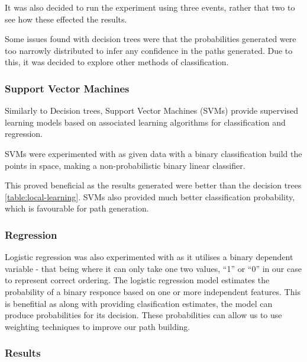 \documentclass[bsc,frontabs,twoside,singlespacing,parskip,deptreport]{infthesis}     %
\begin{document}
It was also decided to run the experiment using three events, rather that two to see how these
effected the results. 

Some issues found with decision trees were that the probabilities generated were too narrowly distributed
to infer any confidence in the paths generated. Due to this, it was decided to explore other methods of
classification.

\subsubsection{Support Vector Machines}
Similarly to Decision trees, Support Vector Machines (SVMs) provide supervised learning models based on
associated learning algorithms for classification and regression.

SVMs were experimented with as given data with a binary classification build the points in space,
making a non-probabilistic binary linear classifier.

This proved beneficial as the results generated were better than the decision trees \ref{table:local-learning}.
SVMs also provided much better classification probability, which is favourable for path generation.
\vspace{4em}
\subsubsection{Regression}
Logistic regression was also experimented with as it utilises a binary dependent variable - that being where it
can only take one two values, ``1'' or ``0'' in our case to represent correct ordering.
The logistic regression model estimates the probability of a binary responce based on one or more independent features.
This is benefitial as along with providing clasification estimates, the model can produce probabilities for its
decision. These probabilities can allow us to use weighting techniques to improve our path building.

\subsubsection{Results}\label{sec:local-results}
\end{document}
